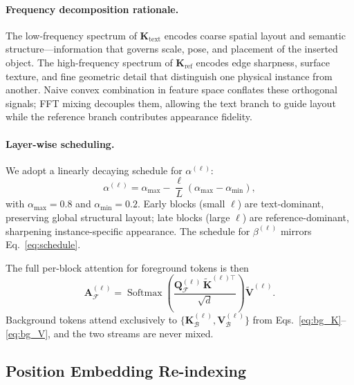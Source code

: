 \paragraph{Frequency decomposition rationale.}
The low-frequency spectrum of $\mathbf{K}_{\text{text}}$ encodes coarse spatial layout and
semantic structure---information that governs scale, pose, and placement of the inserted
object.
The high-frequency spectrum of $\mathbf{K}_{\text{ref}}$ encodes edge sharpness, surface
texture, and fine geometric detail that distinguish one physical instance from another.
Naive convex combination in feature space conflates these orthogonal signals; FFT mixing
decouples them, allowing the text branch to guide layout while the reference branch
contributes appearance fidelity.

\paragraph{Layer-wise scheduling.}
We adopt a linearly decaying schedule for $\alpha^{(\ell)}$:
\begin{equation}
    \alpha^{(\ell)}
        = \alpha_{\max} - \frac{\ell}{L}
          \left(\alpha_{\max} - \alpha_{\min}\right),
    \label{eq:schedule}
\end{equation}
with $\alpha_{\max} = 0.8$ and $\alpha_{\min} = 0.2$.
Early blocks (small $\ell$) are text-dominant, preserving global structural layout; late
blocks (large $\ell$) are reference-dominant, sharpening instance-specific appearance.
The schedule for $\beta^{(\ell)}$ mirrors Eq.~\eqref{eq:schedule}.

The full per-block attention for foreground tokens is then
\begin{equation}
    \mathbf{A}_{\mathcal{F}}^{(\ell)}
        = \operatorname{Softmax}\!\!\left(
              \frac{\mathbf{Q}_{\mathcal{F}}^{(\ell)}\,
                    \tilde{\mathbf{K}}^{(\ell)\top}}{\sqrt{d}}
          \right)\tilde{\mathbf{V}}^{(\ell)}.
    \label{eq:fg_attn}
\end{equation}
Background tokens attend exclusively to
$\{\mathbf{K}_{\mathcal{B}}^{(\ell)}, \mathbf{V}_{\mathcal{B}}^{(\ell)}\}$
from Eqs.~\eqref{eq:bg_K}--\eqref{eq:bg_V}, and the two streams are never mixed.

\subsection{Position Embedding Re-indexing}

